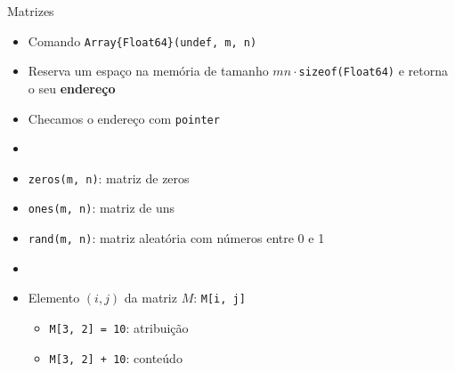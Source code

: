 \documentclass[]{beamer}
\newcommand{\code}[1]{\colorbox[gray]{0.8}{\texttt{#1}}}
\begin{document}
\begin{frame}[fragile]{Matrizes}
  
  \begin{itemize}
  \item Comando \code{Array\{Float64\}(\alert{undef}, m, n)}

  \item Reserva um espaço na memória de tamanho
    $mn\cdot$\verb+sizeof(Float64)+ e retorna o seu \textbf{endereço}

  \item Checamos o endereço com \code{pointer}

  \item[]

  \item \code{zeros(m, n)}: matriz de zeros
  \item \code{ones(m, n)}: matriz de uns
  \item \code{rand(m, n)}: matriz aleatória com números entre 0 e 1

  \item[]

  \item Elemento $(i, j)$ da matriz $M$: \code{M[i, j]}
    
    \begin{itemize}
    \item \code{M[3, 2] = 10}: atribuição
    \item \code{M[3, 2] + 10}: conteúdo
    \end{itemize}

  \end{itemize}
  
\end{frame}
\end{document}
